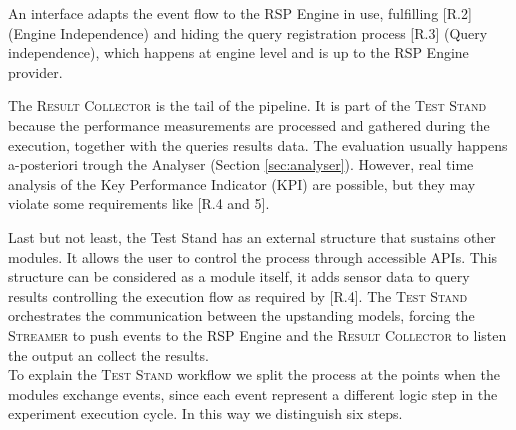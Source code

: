 An interface adapts the event flow to the RSP Engine in use, fulfilling [R.2] (Engine Independence) and hiding the query registration process [R.3] (Query independence), which happens at engine level and is up to the RSP Engine provider.

The \textsc{Result Collector} is the tail of the pipeline. It is part of the \textsc{Test Stand} because the performance measurements are processed and gathered during the execution, together with the queries results data.  The evaluation usually happens a-posteriori trough the Analyser (Section \ref{sec:analyser}). However, real time analysis  of the  Key Performance Indicator (KPI) are possible, but they may violate some requirements like [R.4 and 5]. 

Last but not least,  the Test Stand has an external structure that sustains other modules. It allows the user to control the process through accessible APIs.  This structure can be considered as a module itself, it adds sensor data to query results controlling the execution flow as required by [R.4]. The \textsc{Test Stand} orchestrates the communication between the upstanding models, forcing the \textsc{Streamer} to push events to the RSP Engine and the \textsc{Result Collector} to listen the output an collect the results.\\

\noindent To explain the \textsc{Test Stand} workflow we split the process at the points when the modules exchange events, since each event represent a different logic step in the experiment execution cycle. In this way we distinguish six steps.\\

